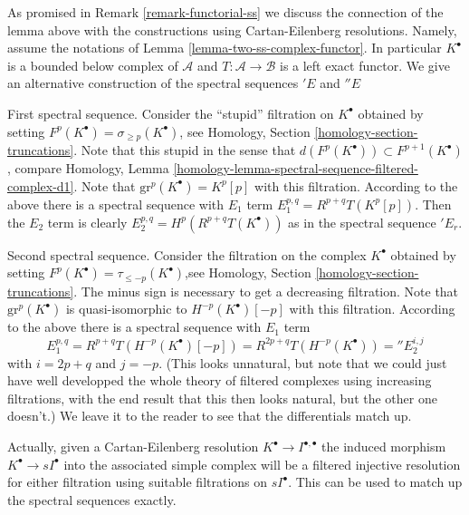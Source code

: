 \begin{remark}
\label{remark-final-functorial}
As promised in
Remark \ref{remark-functorial-ss}
we discuss the connection of the lemma
above with the constructions using Cartan-Eilenberg resolutions.
Namely, assume the notations of
Lemma \ref{lemma-two-ss-complex-functor}.
In particular $K^\bullet$ is a bounded below complex of
$\mathcal{A}$ and $T : \mathcal{A} \to \mathcal{B}$ is a
left exact functor. We give an alternative construction of the
spectral sequences ${}'E$ and ${}''E$ 

\medskip\noindent
First spectral sequence. Consider the ``stupid'' filtration
on $K^\bullet$
obtained by setting $F^p(K^\bullet) = \sigma_{\geq p}(K^\bullet)$, see
Homology, Section \ref{homology-section-truncations}.
Note that this stupid in the sense that
$d(F^p(K^\bullet)) \subset F^{p + 1}(K^\bullet)$, compare
Homology, Lemma \ref{homology-lemma-spectral-sequence-filtered-complex-d1}.
Note that $\text{gr}^p(K^\bullet) = K^p[p]$ with this filtration.
According to the above there is a spectral sequence
with $E_1$ term $E_1^{p, q} = R^{p + q}T(K^p[p])$.
Then the $E_2$ term is clearly $E_2^{p, q} = H^p(R^{p + q}T(K^\bullet))$
as in the spectral sequence ${}'E_r$.

\medskip\noindent
Second spectral sequence. Consider the filtration on the complex $K^\bullet$
obtained by setting $F^p(K^\bullet) = \tau_{\leq -p}(K^\bullet)$,see
Homology, Section \ref{homology-section-truncations}.
The minus sign is necessary
to get a decreasing filtration. Note that
$\text{gr}^p(K^\bullet)$ is quasi-isomorphic to $H^{-p}(K^\bullet)[-p]$
with this filtration. According to the above there is a spectral sequence
with $E_1$ term
$$
E_1^{p, q}
= R^{p + q}T(H^{-p}(K^\bullet)[-p])
= R^{2p + q}T(H^{-p}(K^\bullet)) = {}''E_2^{i, j}
$$
with $i = 2p + q$ and $j = -p$. (This looks unnatural, but note that we
could just have well developped the whole theory of filtered complexes
using increasing filtrations, with the end result that this then looks
natural, but the other one doesn't.) We leave it to the reader to see
that the differentials match up.

\medskip\noindent
Actually, given a Cartan-Eilenberg resolution
$K^\bullet \to I^{\bullet, \bullet}$ the induced morphism
$K^\bullet \to sI^\bullet$ into the associated simple complex
will be a filtered injective resolution for either filtration
using suitable filtrations on $sI^\bullet$. This can be used
to match up the spectral sequences exactly.
\end{remark}










